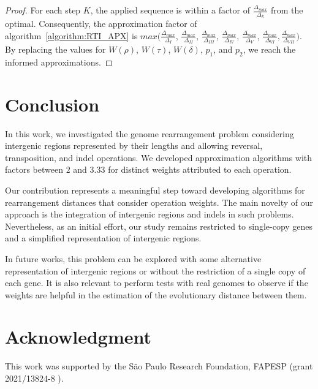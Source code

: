 \documentclass[12pt]{article}
\begin{document}
\begin{proof}
For each step $K$, the applied sequence is within a factor of $\frac{\Delta_{max}}{\Delta_k}$ from the optimal. Consequently, the approximation factor of algorithm~\ref{algorithm:RTI_APX} is $max( \frac{\Delta_{max}}{\Delta_I}$, $\frac{\Delta_{max}}{\Delta_{II}}$, $\frac{\Delta_{max}}{\Delta_{III}}$, $\frac{\Delta_{max}}{\Delta_{IV}}$, $\frac{\Delta_{max}}{\Delta_{V}}$, $\frac{\Delta_{max}}{\Delta_{VI}},\frac{\Delta_{max}}{\Delta_{VII}})$. By replacing the values for $W(\rho)$, $W(\tau)$, $W(\delta)$, $p_1$, and $p_2$, we reach the informed approximations.
\end{proof}

\section{Conclusion}\label{sec:conc}

In this work, we investigated the genome rearrangement problem considering intergenic regions represented by their lengths and allowing reversal, transposition, and indel operations. We developed approximation algorithms with factors between $2$ and $3.33$ for distinct weights attributed to each operation.

Our contribution represents a meaningful step toward developing algorithms for rearrangement distances that consider operation weights. The main novelty of our approach is the integration of intergenic regions and indels in such problems. Nevertheless, as an initial effort, our study remains restricted to single-copy genes and a simplified representation of intergenic regions.

In future works, this problem can be explored with some alternative representation of intergenic regions or without the restriction of a single copy of each gene. It is also relevant to perform tests with real genomes to observe if the weights are helpful in the estimation of the evolutionary distance between them.

\section*{Acknowledgment} This work was supported by the S\~ao Paulo Research Foundation, FAPESP (grant
2021/13824-8%
).


\end{document}
